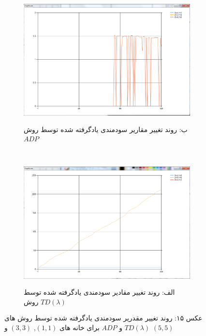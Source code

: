 \documentclass[10pt,a4paper]{article}
\begin{document}
\begin{figure}[h]
        \centering
        \begin{subfigure}[b]{0.5\textwidth}
            \includegraphics[width=\textwidth]{qlambda-adp}
            \begin{center}
                \textarabic{ب: روند تغییر مقاریر سودمندی یادگرفته شده توسط روش $ADP$ }
            \end{center}
        \end{subfigure}%
        ~ %
        \begin{subfigure}[b]{0.5\textwidth}
           \includegraphics[width=\textwidth]{qlambda-td}
            \begin{center}
                \textarabic{الف: روند تغییر مقادیر سودمندی یادگرفته شده توسط روش $TD(\lambda)$ }
            \end{center}
        \end{subfigure}
    \begin{center}
    \textarabic{عکس ۱۵: روند تغییر مقدریر سودمندی یادگرفته شده توسط روش های
     $TD(\lambda)$ و $ADP$
      برای خانه های 
      $(1, 1)$, $(3,3)$ 
     و
      $(5, 5)$     }
    \end{center}
\end{figure}
\end{document}
